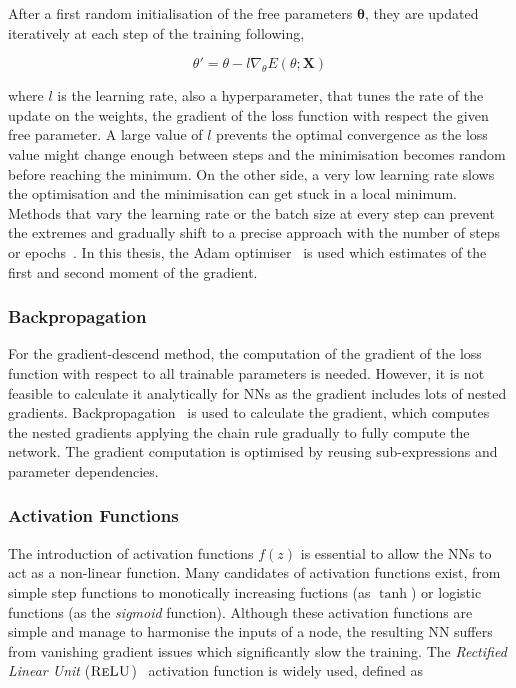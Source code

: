 After a first random initialisation of the free parameters $\boldsymbol{\theta}$, they are updated iteratively at each step of the training following,

\begin{equation}
    \theta' = \theta - l \nabla_\theta E(\theta;\mathbf{X})
\end{equation}

where $l$ is the learning rate, also a hyperparameter, that tunes the rate of the update on the weights, the gradient of the loss function with respect the given free parameter. A large value of $l$ prevents the optimal convergence as the loss value might change enough between steps and the minimisation becomes random before reaching the minimum. On the other side, a very low learning rate slows the optimisation and the minimisation can get stuck in a local minimum. Methods that vary the learning rate or the batch size at every step can prevent the extremes and gradually shift to a precise approach with the number of steps or epochs~\cite{LRBatchSize}. In this thesis, the Adam optimiser~\cite{Kingma2015AdamAM} is used which estimates of the first and second moment of the gradient.

\subsubsection{Backpropagation}

For the gradient-descend method, the computation of the gradient of the loss function with respect to all trainable parameters is needed. However, it is not feasible to calculate it analytically for NNs as the gradient includes lots of nested gradients. Backpropagation~\cite{Rumelhart1986} is used to calculate the gradient, which computes the nested gradients applying the chain rule gradually to fully compute the network. The gradient computation is optimised by reusing sub-expressions and parameter dependencies.

\subsubsection{Activation Functions}

The introduction of activation functions $f(z)$ is essential to allow the NNs to act as a non-linear function. Many candidates of activation functions exist, from simple step functions to monotically increasing fuctions (as $\tanh$) or logistic functions (as the \textit{sigmoid} function). Although these activation functions are simple and manage to harmonise the inputs of a node, the resulting NN suffers from vanishing gradient issues which significantly slow the training. The \textit{Rectified Linear Unit} ($\textsc{ReLU}$)~\cite{relu} activation function is widely used, defined as

